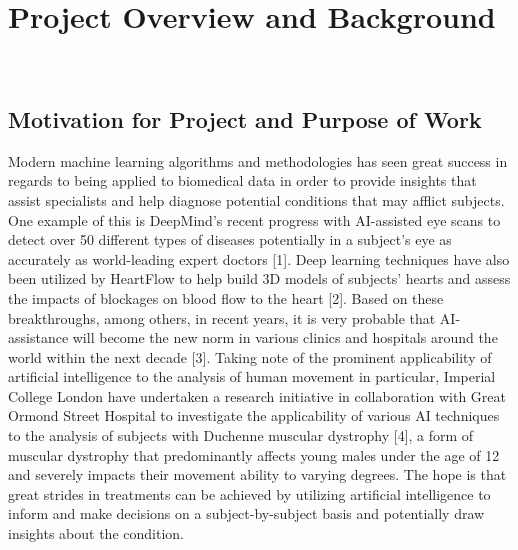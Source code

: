 \documentclass[12pt,twoside]{report}
\begin{document}
\chapter{Project Overview and Background\\~\\}


\section{Motivation for Project and Purpose of Work}

\quad Modern machine learning algorithms and methodologies has seen great success in regards to being applied to biomedical data in order to provide insights that assist specialists and help diagnose potential conditions that may afflict subjects. One example of this is DeepMind’s recent progress with AI-assisted eye scans to detect over 50 different types of diseases potentially in a subject’s eye as accurately as world-leading expert doctors [1]. Deep learning techniques have also been utilized by HeartFlow to help build 3D models of subjects’ hearts and assess the impacts of blockages on blood flow to the heart [2]. Based on these breakthroughs, among others, in recent years, it is very probable that AI-assistance will become the new norm in various clinics and hospitals around the world within the next decade [3]. Taking note of the prominent applicability of artificial intelligence to the analysis of human movement in particular, Imperial College London have undertaken a research initiative in collaboration with Great Ormond Street Hospital to investigate the applicability of various AI techniques to the analysis of subjects with Duchenne muscular dystrophy [4], a form of muscular dystrophy that predominantly affects young males under the age of 12 and severely impacts their movement ability to varying degrees. The hope is that great strides in treatments can be achieved by utilizing artificial intelligence to inform and make decisions on a subject-by-subject basis and potentially draw insights about the condition. \\
\end{document}
